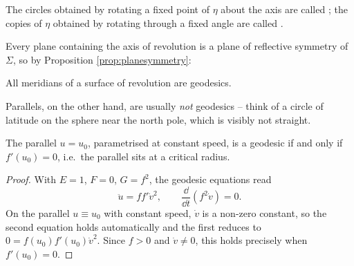 \begin{definition}
    The circles obtained by rotating a fixed point of $\eta$ about the axis are called ; the copies of $\eta$ obtained by rotating through a fixed angle are called .
\end{definition}
\begin{center}
\end{center}

Every plane containing the axis of revolution is a plane of reflective symmetry of $\Sigma$, so by Proposition \ref{prop:planesymmetry}:

\begin{corollary}
    All meridians of a surface of revolution are geodesics.
\end{corollary}

Parallels, on the other hand, are usually \emph{not} geodesics -- think of a circle of latitude on the sphere near the north pole, which is visibly not straight.

\begin{lemma}
    The parallel $u = u_0$, parametrised at constant speed, is a geodesic if and only if $f'(u_0) = 0$, i.e.\ the parallel sits at a critical radius.
\end{lemma}
\begin{proof}
    With $E = 1$, $F = 0$, $G = f^2$, the geodesic equations read
    $$
    \ddot u = f f' \dot v^2, \qquad \frac{\dd}{\dd t}\left(f^2 \dot v\right) = 0.
    $$
    On the parallel $u \equiv u_0$ with constant speed, $\dot v$ is a non-zero constant, so the second equation holds automatically and the first reduces to $0 = f(u_0) f'(u_0) \dot v^2$. Since $f > 0$ and $\dot v \neq 0$, this holds precisely when $f'(u_0) = 0$.
\end{proof}

